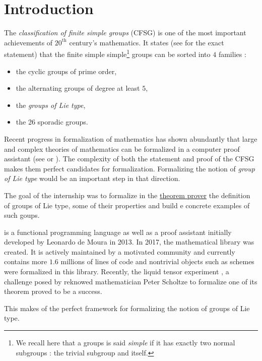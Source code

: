 \section*{Introduction} 
The \emph{classification of finite simple groups} (CFSG) is one of the most important achievements of $20^\text{th}$ century's mathematics. It states (see \cite{wilson_finite_2009} for the exact statement) that the finite simple simple\footnote{We recall here that a groups is said \emph{simple} if it has exactly two normal subgroups : the trivial subgroup and itself.} groups can be sorted into $4$ families :
\begin{itemize}
\setlength\itemsep{.3em}
    \item the cyclic groups of prime order,
    \item the alternating groups of degree at least $5$,
    \item the \emph{groups of Lie type},
    \item the 26 sporadic groups.
\end{itemize}

    Recent progress in formalization of mathematics has shown abundantly that large and complex theories of mathematics can be formalized in a computer proof assistant (see \cite{buzzard_formalising_2020} or \cite{noauthor_leanprover-communitylean-liquid_2024}).
The complexity of both the statement and proof of the CFSG makes them perfect candidates for formalization. Formalizing the notion of \emph{group of Lie type} would be an important step in that direction.

    The goal of the internship was to formalize in the \href{https://lean-lang.org/}{\Lean theorem prover} the definition of groups of Lie type, some of their properties and build e concrete examples of such goups.

  \Lean is a functional programming language as well as a proof assistant initially developed by Leonardo de Moura in 2013. In 2017, the \Lean mathematical library  was created. It is actively maintained by a motivated community and currently contains more $1.6$ millions of lines of code and nontrivial objects such as schemes were formalized in this library. Recently, the liquid tensor experiment \cite{noauthor_leanprover-communitylean-liquid_2024}, a challenge posed by reknowed mathematician Peter Scholtze to formalize one of its theorem proved to be a success.
  
  This makes of \Lean the perfect framework for formalizing the notion of groups of Lie type.

